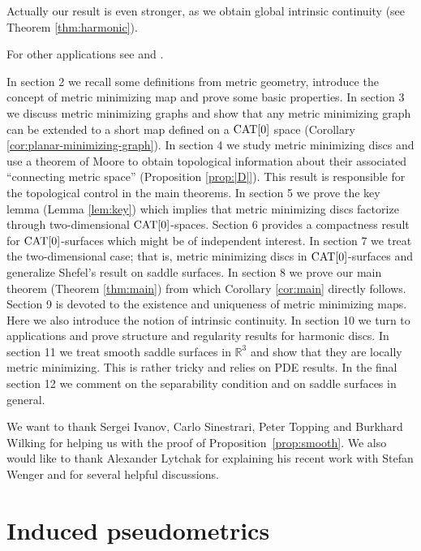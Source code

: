 \documentclass{article}
\begin{document}
Actually our result is even stronger, as we obtain global intrinsic continuity (see Theorem \ref{thm:harmonic}). 

For other applications see \cite{LSW} and \cite{St}. 

In section 2 we recall some definitions from metric geometry, introduce the concept of metric minimizing map and prove some basic properties. 
In section 3 we discuss metric minimizing graphs and show that any metric minimizing graph can be extended to a short
map defined on a $\mathop{\rm CAT}\nolimits[0]$ space (Corollary \ref{cor:planar-minimizing-graph}). 
In section 4 we study metric minimizing discs and
use a theorem of Moore \cite{moore} to obtain topological information about  their 
associated ``connecting metric space'' (Proposition \ref{prop:|D|}). 
This result is responsible for 
the topological control in the main theorems. 
In section 5 we prove the key lemma (Lemma \ref{lem:key}) which implies that 
metric minimizing discs factorize through two-dimensional $\mathop{\rm CAT}\nolimits[0]$-spaces. Section 6 provides a compactness result for $\mathop{\rm CAT}\nolimits[0]$-surfaces
which might be of independent interest. 
In section 7 we treat the two-dimensional case; 
that is, metric minimizing discs in $\mathop{\rm CAT}\nolimits[0]$-surfaces and generalize Shefel's result on saddle surfaces. 
In section 8 we prove our main theorem (Theorem \ref{thm:main})
from which Corollary \ref{cor:main} directly follows. 
Section 9 is devoted to the existence and uniqueness of metric minimizing maps.
Here we also introduce the notion of intrinsic continuity. 
In section 10 we turn to applications and prove structure and regularity results
for harmonic discs. 
In section 11 we treat smooth saddle surfaces in $\mathbb{R}^3$ and show that they are locally metric minimizing.
This is rather tricky and relies on PDE results. 
In the final section 12 we comment on the separability condition and on saddle 
surfaces in general.

We want to thank Sergei Ivanov, Carlo Sinestrari, Peter Topping and
Burkhard Wilking for helping us with the proof of Proposition~\ref{prop:smooth}.
We also would like to thank Alexander Lytchak for explaining his recent work 
with Stefan Wenger and for several helpful discussions.

\section{Induced  pseudometrics}\label{sec:Def}
\end{document}
